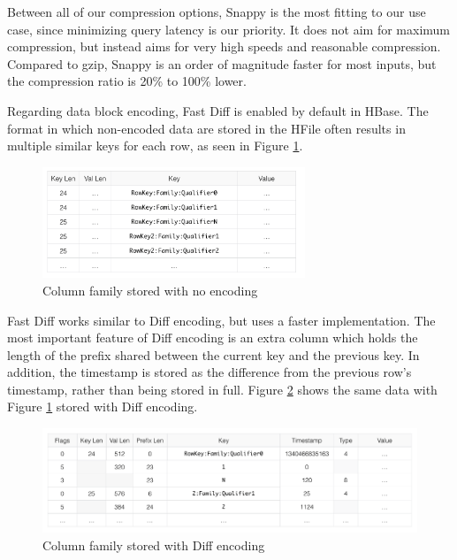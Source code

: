 Between all of our compression options, Snappy \cite{snappy} is the most fitting to our use case, since minimizing query latency is our priority. It does not aim for maximum compression, but instead aims for very high speeds and reasonable compression. Compared to gzip, Snappy is an order of magnitude faster for most inputs, but the compression ratio is 20\% to 100\% lower. 

Regarding data block encoding, Fast Diff \cite{hbase_reference} is enabled by default in HBase. The format in which non-encoded data are stored in the HFile often results in multiple similar keys for each row, as seen in Figure \ref{figure:optimizations_no_encoding}.

\begin{figure}[H]
\centering
\includegraphics[width=0.7\textwidth]{figures/optimizations_no_encoding}
\caption{Column family stored with no encoding}
\label{figure:optimizations_no_encoding}
\end{figure}

Fast Diff works similar to Diff encoding, but uses a faster implementation. The most important feature of Diff encoding is an extra column which holds the length of the prefix shared between the current key and the previous key. In addition, the timestamp is stored as the difference from the previous row's timestamp, rather than being stored in full. Figure \ref{figure:optimizations_diff_encoding} shows the same data with Figure \ref{figure:optimizations_no_encoding} stored with Diff encoding.

\begin{figure}[H]
\centering
\includegraphics[width=\textwidth]{figures/optimizations_diff_encoding}
\caption{Column family stored with Diff encoding}
\label{figure:optimizations_diff_encoding}
\end{figure}

